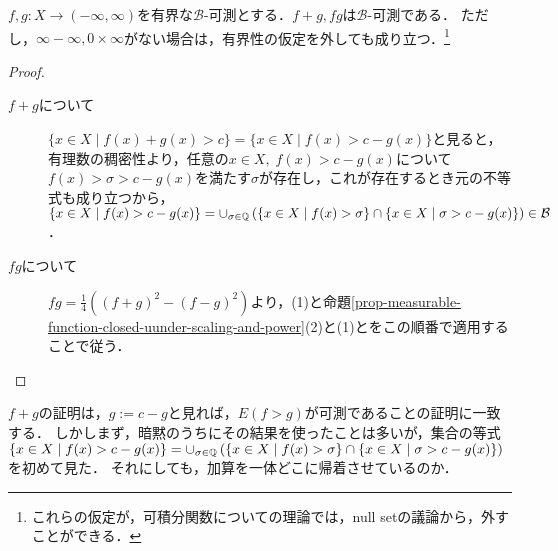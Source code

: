 \documentclass[uplatex, dvipdfmx]{jsreport}
\renewcommand{\B}{\mathcal{B}}
\begin{document}
\begin{proposition}[和と積]\label{prop-sum-and-product-of-measurable-functions}
    $f,g:X\to(-\infty,\infty)$を有界な$\B$-可測とする．$f+g,fg$は$\B$-可測である．
    ただし，$\infty-\infty,0\times\infty$がない場合は，有界性の仮定を外しても成り立つ．\footnote{これらの仮定が，可積分関数についての理論では，null setの議論から，外すことができる．}
\end{proposition}
\begin{proof}\mbox{}
    \begin{description}
        \item[$f+g$について] $\{x\in X\mid f(x)+g(x)>c\}=\{x\in X\mid f(x)>c-g(x)\}$と見ると，有理数の稠密性より，任意の$x\in X,\;f(x)>c-g(x)$について$f(x)>\sigma>c-g(x)$を満たす$\sigma$が存在し，これが存在するとき元の不等式も成り立つから，$\{x\in X\mid f(x)>c-g(x)\}=\cup_{\sigma\in\Q}\paren{\{x\in X\mid f(x)>\sigma\}\cap\{x\in X\mid\sigma>c-g(x)\}}\in\B$．
        \item[$fg$について] $fg=\frac{1}{4}((f+g)^2-(f-g)^2)$より，(1)と命題\ref{prop-measurable-function-closed-uunder-scaling-and-power}(2)と(1)とをこの順番で適用することで従う．
    \end{description}
\end{proof}
\begin{remarks}[可測関数で挟んだ領域の逆像も可算]
    $f+g$の証明は，$g:=c-g$と見れば，$E(f>g)$が可測であることの証明に一致する．
    しかしまず，暗黙のうちにその結果を使ったことは多いが，集合の等式$\{x\in X\mid f(x)>c-g(x)\}=\cup_{\sigma\in\mathbb{Q}}\left(\{x\in X\mid f(x)>\sigma\}\cap\{x\in X\mid\sigma>c-g(x)\}\right)$を初めて見た．
    それにしても，加算を一体どこに帰着させているのか．
\end{remarks}
\end{document}
